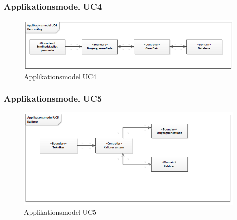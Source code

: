 \subsubsection{Applikationsmodel UC4}
\begin{figure}[H]
\centering
\includegraphics[scale=0.70]{app4.PNG}
\caption{Applikationsmodel UC4}
\end{figure}

\subsubsection{Applikationsmodel UC5}
\begin{figure}[H]
\centering
\includegraphics[scale=0.70]{app5.PNG}
\caption{Applikationsmodel UC5}
\end{figure}

